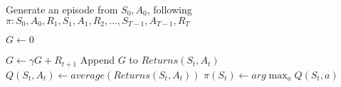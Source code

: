 \begin{enumerate}
\begin{algorithm}[H]
\begin{algorithmic}[1]
		\State Generate an episode from \begin{math}S_0, A_0\end{math}, following \begin{math} \pi: S_0, A_0, R_1, S_1, A_1, R_2, ..., S_{T-1}, A_{T-1}, R_T\end{math}

		\State \begin{math} G \leftarrow 0 \end{math}

			\State \begin{math}G \leftarrow \gamma G + R_{t+1} \end{math}
				\State Append \begin{math} G \end{math} to \begin{math}Returns(S_t, A_t)\end{math}
				\State \begin{math}Q(S_t, A_t) \leftarrow average(Returns(S_t, A_t))\end{math}
				\State \begin{math}\pi(S_t) \leftarrow arg\max_{a}Q(S_t, a) \end{math}
			\EndIf
		\EndFor
	\end{algorithmic}
	\end{algorithm}
\end{enumerate}

